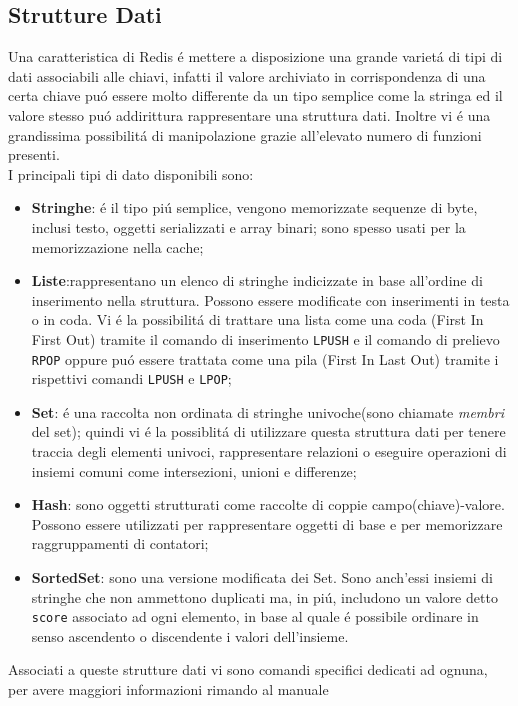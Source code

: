 \subsection{Strutture Dati}
Una caratteristica di Redis é mettere a disposizione una grande varietá di tipi di dati associabili alle chiavi, infatti il valore archiviato
in corrispondenza di una certa chiave puó essere molto differente da un tipo semplice come la stringa ed il valore stesso puó addirittura
rappresentare una struttura dati. Inoltre vi é una grandissima possibilitá di manipolazione grazie all'elevato numero di funzioni presenti.\\
I principali tipi di dato disponibili sono:
\begin{itemize}
    \item \textbf{Stringhe}: é il tipo piú semplice, vengono memorizzate sequenze di byte, inclusi testo, oggetti serializzati e array binari;
    sono spesso usati per la memorizzazione nella cache;
    \item \textbf{Liste}:rappresentano un elenco di stringhe indicizzate in base all'ordine di inserimento nella struttura. Possono essere
    modificate con inserimenti in testa o in coda. Vi é la possibilitá di trattare una lista come una coda (First In First Out) tramite il comando di inserimento
    \texttt{LPUSH} e il comando di prelievo \texttt{RPOP} oppure puó essere trattata come una pila (First In Last Out) tramite i rispettivi comandi 
    \texttt{LPUSH} e \texttt{LPOP};
    \item \textbf{Set}: é una raccolta non ordinata di stringhe univoche(sono chiamate \emph{membri} del set); quindi vi é la possiblitá
    di utilizzare questa struttura dati per tenere traccia degli elementi univoci, rappresentare relazioni o eseguire operazioni di insiemi
    comuni come intersezioni, unioni e differenze;
    \item \textbf{Hash}: sono oggetti strutturati come raccolte di coppie campo(chiave)-valore. Possono essere utilizzati per rappresentare oggetti
    di base e per memorizzare raggruppamenti di contatori;
    \item \textbf{SortedSet}: sono una versione modificata dei Set. Sono anch'essi insiemi di stringhe che non ammettono duplicati ma, in piú,
    includono un valore detto \texttt{score} associato ad ogni elemento, in base al quale é possibile ordinare in senso ascendento o discendente i valori
    dell'insieme.
\end{itemize}
    Associati a queste strutture dati vi sono comandi specifici dedicati ad ognuna, per avere maggiori informazioni rimando al manuale %


